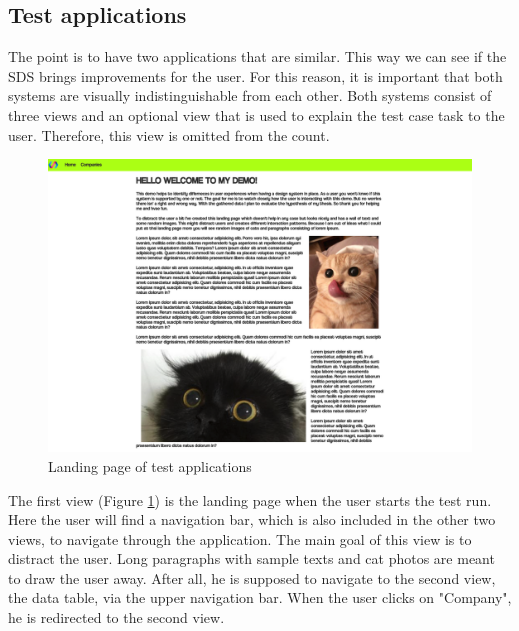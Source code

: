 \subsection{Test applications}
The point is to have two applications that are similar. This way we can see if the SDS brings improvements for the user. For this reason, it is important that both systems are visually indistinguishable from each other. Both systems consist of three views and an optional view that is used to explain the test case task to the user. Therefore, this view is omitted from the count. \\

\begin{figure}[hbtp]
    \centerline{\includegraphics[width=\linewidth, draft=false]{images/demo_view_landing_page.png}}
    \caption{Landing page of test applications}
    \label{landing_page}
    \end{figure}
The first view (Figure \ref{landing_page}) is the landing page when the user starts the test run. Here the user will find a navigation bar, which is also included in the other two views, to navigate through the application. The main goal of this view is to distract the user. Long paragraphs with sample texts and cat photos are meant to draw the user away. After all, he is supposed to navigate to the second view, the data table, via the upper navigation bar. When the user clicks on "Company", he is redirected to the second view. 
\\


